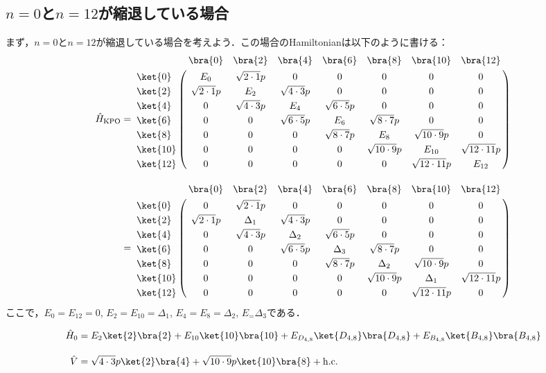 \subsection{$n=0$と$n=12$が縮退している場合}
まず，$n=0$と$n=12$が縮退している場合を考えよう．この場合のHamiltonianは以下のように書ける：
\begin{align}
     \hat{H}_{\rm{KPO}}&=
   \bordermatrix{     
    & \bra{0} &  \bra{2} &  \bra{4}&  \bra{6}&  \bra{8} &\bra{10} &\bra{12}\cr
   \ket{0}&E_0&\sqrt{2\cdot1}p&0&0&0&0&0\cr
  \ket{2}&\sqrt{2\cdot1}p&E_2&\sqrt{4\cdot3}p&0&0&0&0\cr
  \ket{4}&0&\sqrt{4\cdot3}p&E_4&\sqrt{6\cdot5}p&0&0&0\cr
  \ket{6}&0&0&\sqrt{6\cdot5}p&E_6&\sqrt{8\cdot7}p&0&0\cr
  \ket{8}&0&0&0&\sqrt{8\cdot7}p&E_8&\sqrt{10\cdot9}p&0\cr
  \ket{10}&0&0&0&0&\sqrt{10\cdot9}p&E_{10}&\sqrt{12\cdot11}p\cr
  \ket{12}&0&0&0&0&0&\sqrt{12\cdot11}p&E_{12}\cr
            }\\[10pt]
    &=
   \bordermatrix{     
    & \bra{0} &  \bra{2} &  \bra{4}&  \bra{6}&  \bra{8} &\bra{10} &\bra{12}\cr
   \ket{0}&0&\sqrt{2\cdot1}p&0&0&0&0&0\cr
  \ket{2}&\sqrt{2\cdot1}p&\Delta_1&\sqrt{4\cdot3}p&0&0&0&0\cr
  \ket{4}&0&\sqrt{4\cdot3}p&\Delta_2&\sqrt{6\cdot5}p&0&0&0\cr
  \ket{6}&0&0&\sqrt{6\cdot5}p&\Delta_3&\sqrt{8\cdot7}p&0&0\cr
  \ket{8}&0&0&0&\sqrt{8\cdot7}p&\Delta_2&\sqrt{10\cdot9}p&0\cr
  \ket{10}&0&0&0&0&\sqrt{10\cdot9}p&\Delta_1&\sqrt{12\cdot11}p\cr
  \ket{12}&0&0&0&0&0&\sqrt{12\cdot11}p&0\cr
            }
\end{align}
ここで，$E_0=E_12=0$, $E_2=E_{10}=\Delta_1$, $E_4=E_{8}=\Delta_2$, $E_=\Delta_3$である．





\begin{align}
    \hat{H}_0 &= E_{2}\ket{2}\bra{2} + E_{10} \ket{10}\bra{10} + E_{D_{4,8}} \ket{D_{4,8}}\bra{D_{4,8}}+ E_{B_{4,8}} \ket{B_{4,8}}\bra{B_{4,8}}\\[10pt]
    \hat{V}&= \sqrt{4\cdot3}p\ket{2}\bra{4} + \sqrt{10\cdot9}p\ket{10}\bra{8} + {\rm{h.c.}}
\end{align}


